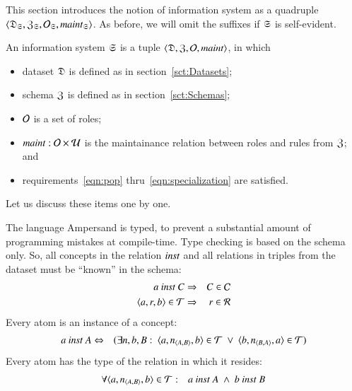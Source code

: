 \documentclass{elsarticle}
\begin{document}
   This section introduces the notion of information system as a quadruple $\langle\mathfrak{D}_{\mathfrak{S}},\mathfrak{Z}_{\mathfrak{S}},\mathcal{O}_{\mathfrak{S}},\text{\it maint\/}_{\mathfrak{S}}\rangle$.
   As before, we will omit the suffixes if $\mathfrak{S}$ is self-evident.
\begin{definition}
\label{def:information system}
\item An information system $\mathfrak{S}$ is a tuple $\langle\mathfrak{D},\mathfrak{Z},\mathcal{O},\text{\it maint\/}\rangle$, in which
\begin{itemize}
   \item dataset $\mathfrak{D}$ is defined as in section~\ref{sct:Datasets};
   \item schema $\mathfrak{Z}$ is defined as in section~\ref{sct:Schemas};
   \item $\mathcal{O}$ is a set of roles;
   \item $\text{\it maint\/} : \mathcal{O}\times\mathcal{U}$ is the maintainance relation between roles and rules from $\mathfrak{Z}$; and
   \item requirements~\ref{eqn:pop} thru~\ref{eqn:specialization} are satisfied.
\end{itemize}
\end{definition}
   Let us discuss these items one by one.

   The language Ampersand is typed, to prevent a substantial amount of programming mistakes at compile-time.
   Type checking is based on the schema only.
   So, all concepts in the relation $\text{\it inst\/}$ and all relations in triples from the dataset must be ``known'' in the schema:
\begin{eqnarray}
   a\ \text{\it inst\/}\ C&\Rightarrow&C\in\mathcal{C}
   \label{eqn:concepts}\\
   \langle{a},{r},{b}\rangle\in\mathcal{T}&\Rightarrow&r\in\mathcal{R}
   \label{eqn:define R}
\end{eqnarray}
   Every atom is an instance of a concept:
\begin{eqnarray}
   a\ \inst\ A&\Leftrightarrow&(\exists n,b,B:\ \triple{a}{\declare{n}{A}{B}}{b}\in\triples\ \vee\ \triple{b}{\declare{n}{B}{A}}{a}\in\triples)
   \label{eqn:instance}
\end{eqnarray}
   Every atom has the type of the relation in which it resides:
\begin{eqnarray}
   \forall\triple{a}{\declare{n}{A}{B}}{b}\in\triples&:&a\ \inst\ A\ \wedge\ b\ \inst\ B
   \label{eqn:type}
\end{eqnarray}
\end{document}
